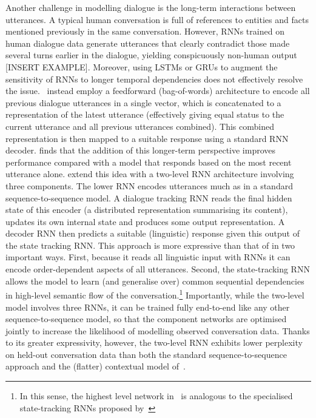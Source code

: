 \documentclass[11pt,letterpaper]{article}
\begin{document}
Another challenge in modelling dialogue is the long-term interactions between utterances. A typical human conversation is full of references to entities and facts mentioned previously in the same conversation. However, RNNs trained on human dialogue data generate utterances that clearly contradict those made several turns earlier in the dialogue, yielding conspicuously non-human output [INSERT EXAMPLE]. Moreover, using LSTMs or GRUs to augment the sensitivity of RNNs to longer temporal dependencies does not effectively resolve the issue.~ instead employ a feedforward (bag-of-words) architecture to encode all previous dialogue utterances in a single vector, which is concatenated to a representation of the latest utterance (effectively giving equal status to the current utterance and all previous utterances combined). This combined representation is then mapped to a suitable response using a standard RNN decoder.  finds that the addition of this longer-term perspective improves performance compared with a model that responds based on the most recent utterance alone.  extend this idea with a two-level RNN architecture involving three components. The lower RNN encodes utterances much as in a standard sequence-to-sequence model. A dialogue tracking RNN reads the final hidden state of this encoder (a distributed representation summarising its content), updates its own internal state and produces some output representation. A decoder RNN then predicts a suitable (linguistic) response given this output of the state tracking RNN. This approach is more expressive than that of \cite{sordoni2015neural} in two important ways. First, because it reads all linguistic input with RNNs it can encode order-dependent aspects of all utterances. Second, the state-tracking RNN allows the model to learn (and generalise over) common sequential dependencies in high-level semantic flow of the conversation.\footnote{In this sense, the highest level network in~\cite{serban2016building} is analogous to the specialised state-tracking RNNs proposed by~} Importantly, while the two-level model involves three RNNs, it can be trained fully end-to-end like any other sequence-to-sequence model, so that the component networks are optimised jointly to increase the likelihood of modelling observed conversation data. Thanks to its greater expressivity, however, the two-level RNN exhibits lower perplexity on held-out conversation data than both the standard sequence-to-sequence approach and the (flatter) contextual model of~\cite{sordoni2015neural}.
\end{document}
